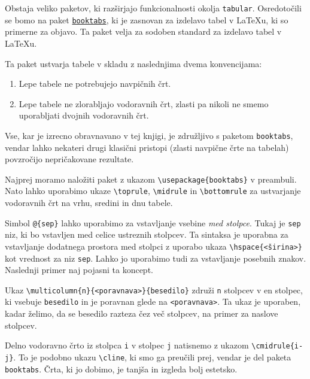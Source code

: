 Obstaja veliko paketov, ki razširjajo funkcionalnosti okolja \texttt{tabular}. Osredotočili se bomo na paket \href{https://ctan.org/pkg/booktabs?lang=en}{\texttt{booktabs}}, ki je zasnovan za izdelavo tabel v LaTeXu, ki so primerne za objavo. Ta paket velja za sodoben standard za izdelavo tabel v LaTeXu.

Ta paket ustvarja tabele v skladu z naslednjima dvema konvencijama:

\begin{enumerate}
\item Lepe tabele ne potrebujejo navpičnih črt.
\item Lepe tabele ne zlorabljajo vodoravnih črt, zlasti pa nikoli ne smemo uporabljati dvojnih vodoravnih črt.
\end{enumerate}

Vse, kar je izrecno obravnavano v tej knjigi, je združljivo s paketom \texttt{booktabs}, vendar lahko nekateri drugi klasični pristopi (zlasti navpične črte na tabelah) povzročijo nepričakovane rezultate.

Najprej moramo naložiti paket z ukazom \texttt{{\textbackslash}usepackage\{booktabs\}} v preambuli.
Nato lahko uporabimo ukaze \texttt{{\textbackslash}toprule}, \texttt{{\textbackslash}midrule} in \texttt{{\textbackslash}bottomrule} za ustvarjanje vodoravnih črt na vrhu, sredini in dnu tabele.

\begin{example}\label{eg_booktabs}\end{example}Simbol \texttt{@\{sep\}} lahko uporabimo za vstavljanje vsebine \textit{med stolpce}. Tukaj je \texttt{sep} niz, ki bo vstavljen med celice ustreznih stolpcev.
Ta sintaksa je uporabna za vstavljanje dodatnega prostora med stolpci z uporabo ukaza \texttt{{\textbackslash}hspace\{\textless širina\textgreater \}} kot vrednost za niz \texttt{sep}.
Lahko jo uporabimo tudi za vstavljanje posebnih znakov.
Naslednji primer naj pojasni ta koncept.

\begin{example}\label{eg_booktabs-2}\end{example}Ukaz \texttt{{\textbackslash}multicolumn\{n\}\{\textless poravnava\textgreater \}\{besedilo\}} združi \texttt{n} stolpcev v en stolpec, ki vsebuje \texttt{besedilo} in je poravnan glede na \texttt{\textless poravnava\textgreater }.
Ta ukaz je uporaben, kadar želimo, da se besedilo razteza čez več stolpcev, na primer za naslove stolpcev.

Delno vodoravno črto iz stolpca \texttt{i} v stolpec \texttt{j} natisnemo z ukazom \texttt{{\textbackslash}cmidrule\{i-j\}}. To je podobno ukazu \texttt{{\textbackslash}cline}, ki smo ga preučili prej, vendar je del paketa \texttt{booktabs}.
Črta, ki jo dobimo, je tanjša in izgleda bolj estetsko.

